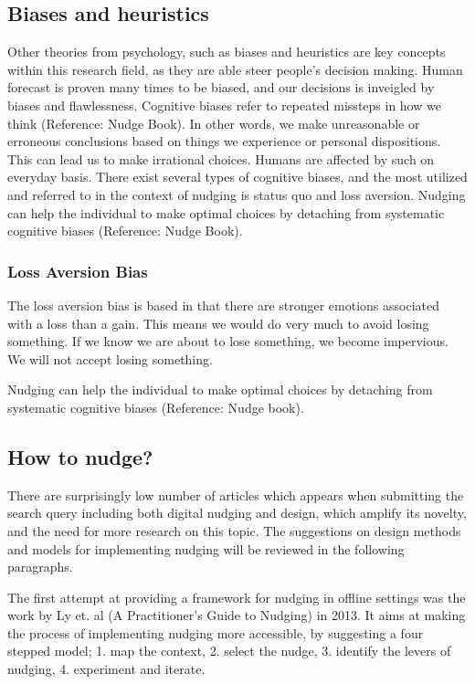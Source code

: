 \subsection{Biases and heuristics }
Other theories from psychology, such as biases and heuristics are key concepts within this research field, as they are able steer people's decision making. Human forecast is proven many times to be biased, and our decisions is inveigled by biases and flawlessness. Cognitive biases refer to repeated missteps in how we think (Reference: Nudge Book). In other words, we make unreasonable or erroneous conclusions based on things we experience or personal dispositions. This can lead us to make irrational choices. Humans are affected by such on everyday basis. There exist several types of cognitive biases, and the most utilized and referred to in the context of nudging is status quo and loss aversion. Nudging can help the individual to make optimal choices by detaching from systematic cognitive biases (Reference: Nudge Book). 

\subsubsection{Loss Aversion Bias}
The loss aversion bias is based in that there are stronger emotions associated with a loss than a gain. This means we would do very much to avoid losing something. If we know we are about to lose something, we become impervious. We will not accept losing something.

Nudging can help the individual to make optimal choices by detaching from systematic cognitive biases (Reference: Nudge book). 

\subsection{How to nudge?}
There are surprisingly low number of articles which appears when submitting the search query including both digital nudging and design, which amplify its novelty, and the need for more research on this topic. The suggestions on design methods and models for implementing nudging will be reviewed in the following paragraphs. 

The first attempt at providing a framework for nudging in offline settings was the work by Ly et. al (A Practitioner’s Guide to Nudging) in 2013. It aims at making the process of implementing nudging more accessible, by suggesting a four stepped model; 1. map the context, 2. select the nudge, 3. identify the levers of nudging, 4. experiment and iterate. %

